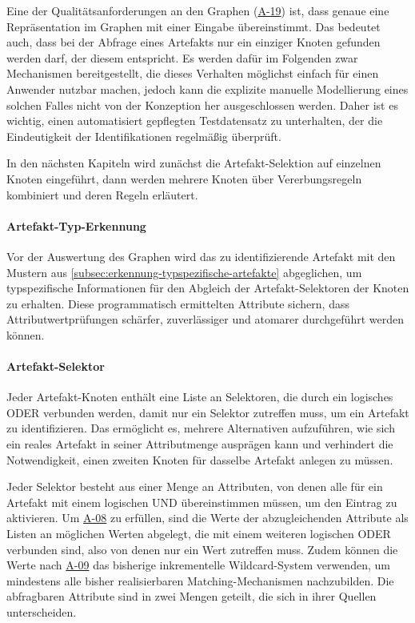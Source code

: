 Eine der Qualitätsanforderungen an den Graphen (\hyperref[subsec:req-graph-inner-consistency]{A-19}) ist, dass genaue eine Repräsentation im Graphen mit einer Eingabe übereinstimmt.
Das bedeutet auch, dass bei der Abfrage eines Artefakts nur ein einziger Knoten gefunden werden darf, der diesem entspricht.
Es werden dafür im Folgenden zwar Mechanismen bereitgestellt, die dieses Verhalten möglichst einfach für einen Anwender nutzbar machen, jedoch kann die explizite manuelle Modellierung eines solchen Falles nicht von der Konzeption her ausgeschlossen werden.
Daher ist es wichtig, einen automatisiert gepflegten Testdatensatz zu unterhalten, der die Eindeutigkeit der Identifikationen regelmäßig überprüft.

In den nächsten Kapiteln wird zunächst die Artefakt-Selektion auf einzelnen Knoten eingeführt, dann werden mehrere Knoten über Vererbungsregeln kombiniert und deren Regeln erläutert.

\paragraph{Artefakt-Typ-Erkennung}

Vor der Auswertung des Graphen wird das zu identifizierende Artefakt mit den Mustern aus \autoref{subsec:erkennung-typspezifische-artefakte} abgeglichen, um typspezifische Informationen für den Abgleich der Artefakt-Selektoren der Knoten zu erhalten.
Diese programmatisch ermittelten Attribute sichern, dass Attributwertprüfungen schärfer, zuverlässiger und atomarer durchgeführt werden können.

\paragraph{Artefakt-Selektor}

Jeder Artefakt-Knoten enthält eine Liste an Selektoren, die durch ein logisches ODER verbunden werden, damit nur ein Selektor zutreffen muss, um ein Artefakt zu identifizieren.
Das ermöglicht es, mehrere Alternativen aufzuführen, wie sich ein reales Artefakt in seiner Attributmenge ausprägen kann und verhindert die Notwendigkeit, einen zweiten Knoten für dasselbe Artefakt anlegen zu müssen.

Jeder Selektor besteht aus einer Menge an Attributen, von denen alle für ein Artefakt mit einem logischen UND übereinstimmen müssen, um den Eintrag zu aktivieren.
Um \hyperref[subsec:req-multiple-attribute-values]{A-08} zu erfüllen, sind die Werte der abzugleichenden Attribute als Listen an möglichen Werten abgelegt, die mit einem weiteren logischen ODER verbunden sind, also von denen nur ein Wert zutreffen muss.
Zudem können die Werte nach \hyperref[subsec:req-regex-support]{A-09} das bisherige inkrementelle Wildcard-System verwenden, um mindestens alle bisher realisierbaren Matching-Mechanismen nachzubilden.
Die abfragbaren Attribute sind in zwei Mengen geteilt, die sich in ihrer Quellen unterscheiden.

